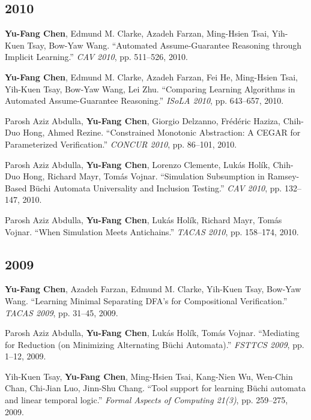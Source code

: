 \documentclass[10.5pt]{article}
\begin{document}
\subsection*{2010}
\begin{enumerate}[leftmargin=*,label={[\arabic*]},resume]
\item \textbf{Yu-Fang Chen}, Edmund M. Clarke, Azadeh Farzan, Ming-Hsien Tsai, Yih-Kuen Tsay, Bow-Yaw Wang. ``Automated Assume-Guarantee Reasoning through Implicit Learning.'' \emph{CAV 2010}, pp. 511--526, 2010.
\item \textbf{Yu-Fang Chen}, Edmund M. Clarke, Azadeh Farzan, Fei He, Ming-Hsien Tsai, Yih-Kuen Tsay, Bow-Yaw Wang, Lei Zhu. ``Comparing Learning Algorithms in Automated Assume-Guarantee Reasoning.'' \emph{ISoLA 2010}, pp. 643--657, 2010.
\item Parosh Aziz Abdulla, \textbf{Yu-Fang Chen}, Giorgio Delzanno, Frédéric Haziza, Chih-Duo Hong, Ahmed Rezine. ``Constrained Monotonic Abstraction: A CEGAR for Parameterized Verification.'' \emph{CONCUR 2010}, pp. 86--101, 2010.
\item Parosh Aziz Abdulla, \textbf{Yu-Fang Chen}, Lorenzo Clemente, Lukás Holík, Chih-Duo Hong, Richard Mayr, Tomás Vojnar. ``Simulation Subsumption in Ramsey-Based Büchi Automata Universality and Inclusion Testing.'' \emph{CAV 2010}, pp. 132--147, 2010.
\item Parosh Aziz Abdulla, \textbf{Yu-Fang Chen}, Lukás Holík, Richard Mayr, Tomás Vojnar. ``When Simulation Meets Antichains.'' \emph{TACAS 2010}, pp. 158--174, 2010.
\end{enumerate}
\subsection*{2009}
\begin{enumerate}[leftmargin=*,label={[\arabic*]},resume]
\item \textbf{Yu-Fang Chen}, Azadeh Farzan, Edmund M. Clarke, Yih-Kuen Tsay, Bow-Yaw Wang. ``Learning Minimal Separating DFA's for Compositional Verification.'' \emph{TACAS 2009}, pp. 31--45, 2009.
\item Parosh Aziz Abdulla, \textbf{Yu-Fang Chen}, Lukás Holík, Tomás Vojnar. ``Mediating for Reduction (on Minimizing Alternating Büchi Automata).'' \emph{FSTTCS 2009}, pp. 1--12, 2009.
\item Yih-Kuen Tsay, \textbf{Yu-Fang Chen}, Ming-Hsien Tsai, Kang-Nien Wu, Wen-Chin Chan, Chi-Jian Luo, Jinn-Shu Chang. ``Tool support for learning Büchi automata and linear temporal logic.'' \emph{Formal Aspects of Computing 21(3)}, pp. 259--275, 2009.
\end{enumerate}
\end{document}
